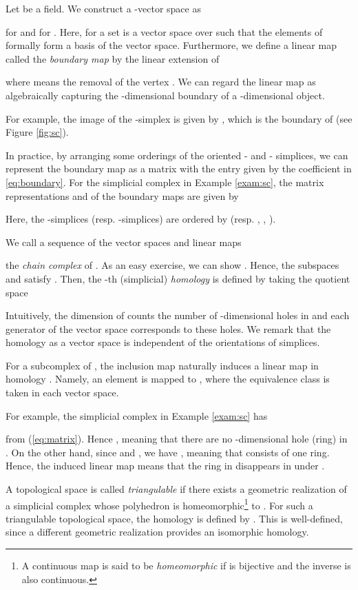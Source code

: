 \documentclass{article}
\begin{document}
Let  be a field. We construct a -vector space  as 

for  and  for .
Here,  for a set  is a vector space over  such that the elements of  formally form a basis of the vector space.
Furthermore, we define a linear map called the {\em boundary map}  by the linear extension of 

where  means the removal of the vertex . We can regard the linear map  as algebraically capturing the -dimensional boundary of a -dimensional object. 

For example, the image of the -simplex  is given by , which is the boundary of  (see Figure \ref{fig:sc}). 

In practice, by arranging some orderings of the oriented - and - simplices, we can represent the boundary map as a matrix  with the entry  given by the coefficient in \eqref{eq:boundary}.
For the simplicial complex  in Example \ref{exam:sc}, the matrix representations  and  of the boundary maps are  given by 

Here, the -simplices (resp. -simplices) are ordered by  (resp. , , ).


We call a sequence of the vector spaces and linear maps

the {\em chain complex} of . As an easy exercise, we can show .
Hence, the subspaces  and  satisfy . Then, the -th (simplicial) {\em homology} is defined by taking the quotient space

Intuitively, the dimension of  counts the number of -dimensional holes in  and each generator of the vector space  corresponds to these holes.
We remark that the homology as a vector space is independent of the orientations of simplices. 

For a subcomplex  of , the inclusion map  naturally induces a linear map in homology . Namely, an element  is mapped to , where the equivalence class  is taken in each vector space. 

For example, the simplicial complex  in Example \ref{exam:sc} has 

 from (\ref{eq:matrix}). Hence , meaning that there are no -dimensional hole (ring) in .
On the other hand, since  and , we have , meaning that  consists of one ring.
Hence, the induced linear map  means that the ring in  disappears in  under .

A topological space  is called {\em triangulable} if there exists a geometric realization of a simplicial complex  whose polyhedron is homeomorphic\footnote{A continuous map  is said to be {\em homeomorphic} if  is bijective and the inverse  is also continuous.} to .
For such a triangulable topological space, the homology is defined by .
This is well-defined, since a different geometric realization provides an isomorphic homology. 
\end{document}
